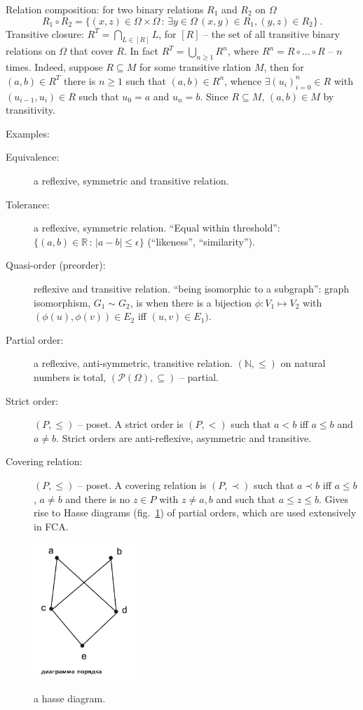 \documentclass[a4paper,14pt]{extarticle}
\begin{document}
\noindent Relation composition: for two binary relations $R_1$ and $R_2$ on $\Omega$
$$ R_1\circ R_2
    = \{(x,z)\in \Omega\times\Omega
        \,:\, \exists y\in \Omega\, (x,y)\in R_1, (y,z)\in R_2\}
    \,. $$
\noindent Transitive closure:
$R^T = \bigcap_{L\in [R]} L$, for $[R]$ -- the set of all transitive binary
relations on $\Omega$ that cover $R$. In fact $R^T = \bigcup_{n\geq1} R^n$,
where $R^n = R\circ \ldots \circ R$ -- $n$ times. Indeed, suppose $R\subseteq M$
for some transitive rlation $M$, then for $(a,b)\in R^T$ there is $n\geq 1$
such that $(a,b)\in R^n$, whence $\exists (u_i)_{i=0}^n\in R$ with $(u_{i-1}, u_i)\in R$
such that $u_0=a$ and $u_n=b$. Since $R\subseteq M$, $(a,b)\in M$ by transitivity.

\noindent Examples: \begin{description}
    \item[Equivalence:] a reflexive, symmetric and transitive relation.
    \item[Tolerance:] a reflexive, symmetric relation.
    ``Equal within threshold'': $\{(a,b)\in \mathbb{R}\,:\, |a-b|\leq \epsilon\}$
    (``likeness'', ``similarity'').
    \item[Quasi-order (preorder):] reflexive and transitive relation.
    ``being isomorphic to a subgraph'': graph isomorphism, $G_1 \sim G_2$, is when
    there is a bijection $\phi:V_1\mapsto V_2$ with $(\phi(u),\phi(v))\in E_2$ iff
    $(u,v)\in E_1)$.
    \item[Partial order:] a reflexive, anti-symmetric, transitive relation.
    $(\mathbb{N}, \leq)$ on natural numbers is total, $(\mathcal{P}(\Omega),
    \subseteq)$ -- partial.
    \item[Strict order:] $(P, \leq)$ -- poset. A strict order is $(P, <)$ such
    that $a<b$ iff $a\leq b$ and $a\neq b$. Strict orders are anti-reflexive,
    asymmetric and transitive.
    \item[Covering relation:] $(P, \leq)$ -- poset. A covering relation is $(P, \prec)$
    such that $a\prec b$ iff $a\leq b$, $a\neq b$ and there is no $z\in P$ with $z\neq a,b$
    and such that $a\leq z\leq b$. Gives rise to Hasse diagrams (fig.~\ref{fig:hasse})
    of partial orders, which are used extensively in FCA.
\end{description}
\begin{figure}
    \centering
    \includegraphics[width=0.35\textwidth]{hasse.png}
    \label{fig:hasse}
    \caption{a hasse diagram.}
\end{figure}
\end{document}
